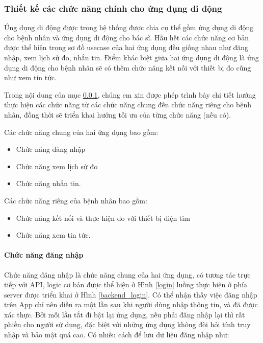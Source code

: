 \subsubsection{Thiết kế các chức năng chính cho ứng dụng di động}
\label{design_function_mobile}

Ứng dụng di động được trong hệ thống được chia cụ thể gồm ứng dụng di động cho bệnh nhân và ứng dụng di động cho bác sĩ. 
Hầu hết các chức năng cơ bản được thể hiện trong sơ đồ usecase của hai ứng dụng đều giống nhau như đăng nhập, xem lịch sử đo, nhắn tin.
Điểm khác biệt giữa hai ứng dụng di động là ứng dụng di động cho bệnh nhân sẽ có thêm chức năng kết nối với thiết bị đo cũng như xem tin tức.

Trong nội dung của mục \ref{design_function_mobile}, chúng em xin được phép trình bày chi tiết hướng thực hiện các chức năng
từ các chức năng chung đến chức năng riêng cho bệnh nhân, đồng thời sẽ triển khai hướng tối ưu của từng chức năng (nếu có).

Các chức năng chung của hai ứng dụng bao gồm: 
\begin{itemize}
  \item Chức năng đăng nhập
  \item Chức năng xem lịch sử đo
  \item Chức năng nhắn tin.
\end{itemize}

Các chức năng riêng của bệnh nhân bao gồm:
\begin{itemize}
  \item Chức năng kết nối và thực hiện đo với thiết bị điện tim
  \item Chức năng xem tin tức.
\end{itemize}

\paragraph{Chức năng đăng nhập}
\mbox{}

Chức năng đăng nhập là chức năng chung của hai ứng dụng, có tương tác trực tiếp với API, logic cơ bản được thể hiện ở Hình \ref{login}
luồng thực hiện ở phía server được triển khai ở 
Hình \ref{backend_login}. Có thể nhận thấy việc đăng nhập trên App chỉ nên diễn ra một lần sau khi người dùng nhập thông tin,
và đã được xác thực. Bởi mỗi lần tắt đi bật lại ứng dụng, nếu phải đăng nhập lại thì rất phiền cho người sử dụng, đặc biệt
với những ứng dụng không đòi hỏi tính truy nhập và bảo mật quá cao. Có nhiều cách để lưu dữ liệu đăng nhập như:

